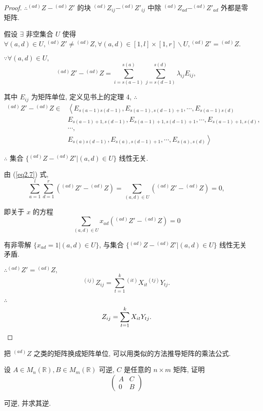 \documentclass{ctexart}
\begin{document}
\begin{proof}
    $\therefore{}^{(ad)}Z-{}^{(ad)}Z'$ 的块 $^{(ad)}Z_{ij}-^{(ad)}Z'_{ij}$ 中除 $^{(ad)}Z_{ad}-^{(ad)}Z'_{ad}$ 外都是零矩阵.

    假设 $\exists$ 非空集合 $U$ 使得 $\forall (a,d)\in U,{}^{(ad)}Z'\neq{}^{(ad)}Z,\forall (a,d)\in[1,l]\times[1,r]\backslash U,{}^{(ad)}Z'={}^{(ad)}Z$.

    $\because\forall (a,d)\in U,$
    \[{}^{(ad)}Z'-{}^{(ad)}Z=\sum\limits_{i=s(a-1)}^{s(a)}\sum\limits_{j=s(d-1)}^{s(d)}\lambda_{ij}E_{ij},\]

    其中 $E_{ij}$ 为矩阵单位, 定义见书上的定理 4, $\therefore$
    \begin{align*}
        {}^{(ad)}Z'-{}^{(ad)}Z\in & \left<E_{s(a-1)s(d-1)},E_{s(a-1),s(d-1)+1},\cdots,E_{s(a-1)s(d)}\right. \\
        & E_{s(a-1)+1,s(d-1)},E_{s(a-1)+1,s(d-1)+1},\cdots,E_{s(a-1)+1,s(d)}, \\
        & \cdots, \\
        & \left.E_{s(a)s(d-1)},E_{s(a),s(d-1)+1},\cdots,E_{s(a),s(d)}\right>
    \end{align*}
    
    $\therefore$ 集合 $\{{}^{(ad)}Z-{}^{(ad)}Z'|(a,d)\in U\}$ 线性无关.

    由 (\ref{eq2.7}) 式,
    \[\sum\limits_{a=1}^{l}\sum\limits_{d=1}^{r}({}^{(ad)}Z'-{}^{(ad)}Z)=\sum\limits_{(a,d)\in U}({}^{(ad)}Z'-{}^{(ad)}Z)=0,\]

    即关于 $x$ 的方程
    \[\sum\limits_{(a,d)\in U}x_{ad}({}^{(ad)}Z'-{}^{(ad)}Z)=0\]

    有非零解 $\{x_{ad}=1|(a,d)\in U\}$, 与集合 $\{{}^{(ad)}Z-{}^{(ad)}Z'|(a,d)\in U\}$ 线性无关矛盾.

    $\therefore{}^{(ad)}Z'={}^{(ad)}Z,$
    \[^{(ij)}Z_{ij}=\sum\limits_{t=1}^k{}^{(it)}X_{it}{}^{(tj)}Y_{tj}.\]

    $\therefore$
    \[Z_{ij}=\sum\limits_{t=1}^kX_{it}Y_{tj}.\qedhere\]
\end{proof}
\begin{note}
    把 $^{(ad)}Z$ 之类的矩阵换成矩阵单位, 可以用类似的方法推导矩阵的乘法公式.
\end{note}
\begin{exercisec}[第 4 章的习题 3.9]
    设 $A\in M_n(\mathbb{R}),B\in M_m(\mathbb{R})$ 可逆, $C$ 是任意的 $n\times m$ 矩阵, 证明
    \[\begin{pmatrix}
        A & C \\
        0 & B
    \end{pmatrix}\]

    可逆, 并求其逆.
\end{exercisec}
\end{document}
